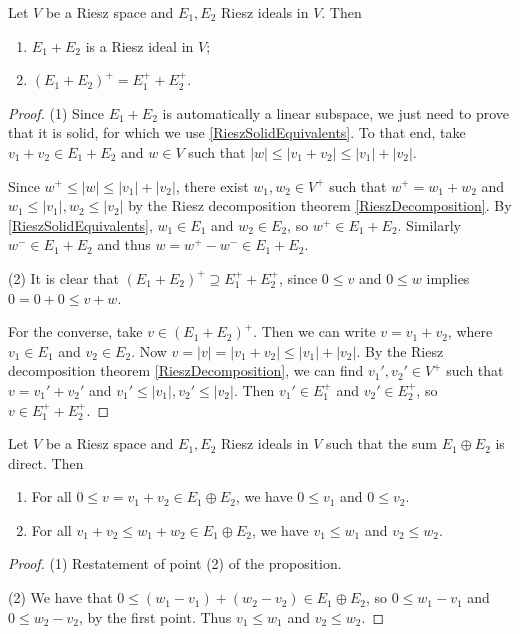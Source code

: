 \begin{proposition} \label{sumRieszIdeals}
Let $V$ be a Riesz space and $E_1, E_2$ Riesz ideals in $V$. Then
\begin{enumerate}
\item $E_1 + E_2$ is a Riesz ideal in $V$;
\item $(E_1 + E_2)^+ = E_1^+ + E_2^+$.
\end{enumerate}
\end{proposition}
\begin{proof}
(1) Since $E_1+E_2$ is automatically a linear subspace, we just need to prove that it is solid, for which we use \ref{RieszSolidEquivalents}. To that end, take $v_1+v_2\in E_1+E_2$ and $w\in V$ such that $|w| \leq |v_1 + v_2| \leq |v_1| + |v_2|$.

Since $w^+ \leq |w| \leq |v_1| + |v_2|$, there exist $w_1, w_2\in V^+$ such that $w^+= w_1+w_2$ and $w_1\leq |v_1|, w_2\leq |v_2|$ by the Riesz decomposition theorem \ref{RieszDecomposition}. By \ref{RieszSolidEquivalents}, $w_1\in E_1$ and $w_2\in E_2$, so $w^+\in E_1+E_2$. Similarly $w^-\in E_1+E_2$ and thus $w = w^+-w^-\in E_1+E_2$.

(2) It is clear that $(E_1 + E_2)^+ \supseteq E_1^+ + E_2^+$, since $0\leq v$ and $0\leq w$ implies $0 = 0+0\leq v+w$.

For the converse, take $v\in (E_1+E_2)^+$. Then we can write $v = v_1+v_2$, where $v_1\in E_1$ and $v_2\in E_2$. Now $v = |v| = |v_1 + v_2| \leq |v_1| + |v_2|$. By the Riesz decomposition theorem \ref{RieszDecomposition}, we can find $v_1',v_2'\in V^+$ such that $v = v_1'+v_2'$ and $v_1'\leq |v_1|, v_2'\leq |v_2|$. Then $v_1'\in E_1^+$ and $v_2'\in E_2^+$, so $v\in E_1^+ + E_2^+$.
\end{proof}
\begin{corollary} \label{RieszIdealDirectSumPreservesOrder}
Let $V$ be a Riesz space and $E_1, E_2$ Riesz ideals in $V$ such that the sum $E_1\oplus E_2$ is direct. Then
\begin{enumerate}
\item For all $0\leq v = v_1 + v_2 \in E_1\oplus E_2$, we have $0\leq v_1$ and $0\leq v_2$.
\item For all $v_1 +v_2 \leq w_1 + w_2 \in E_1\oplus E_2$, we have $v_1 \leq w_1$ and $v_2 \leq w_2$.
\end{enumerate}
\end{corollary}
\begin{proof}
(1) Restatement of point (2) of the proposition.

(2) We have that $0\leq (w_1 - v_1) + (w_2 - v_2) \in E_1\oplus E_2$, so $0\leq w_1 - v_1$ and $0\leq w_2 - v_2$, by the first point. Thus $v_1\leq w_1$ and $v_2\leq w_2$.
\end{proof}

